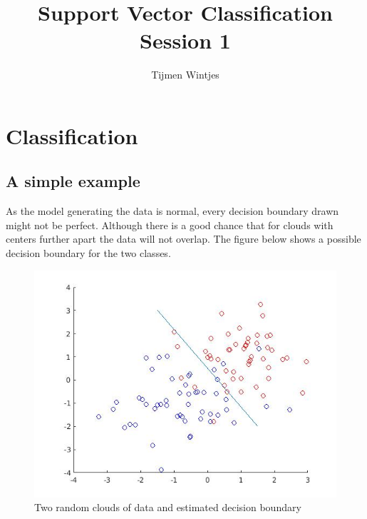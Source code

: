 \documentclass[•]{article}
\author{Tijmen Wintjes}
\title{Support Vector Classification \\ Session 1}
\begin{document}
\maketitle
\setlength\parindent{0pt}

\section{Classification}


\subsection {A simple example}
As the model generating the data is normal, every decision boundary drawn might not be perfect. Although there is a good chance that for clouds with centers further apart the data will not overlap. The figure below shows a possible decision boundary for the two classes. 

\begin{figure}[h!]
\includegraphics[scale=.5]{plotex11.jpg}
\caption{Two random clouds of data and estimated decision boundary}
\end{figure}
\end{document}
